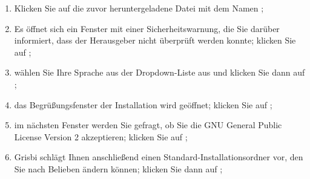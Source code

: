 \begin{enumerate}
	\item Klicken Sie auf die zuvor heruntergeladene Datei mit dem Namen ;
	\item Es öffnet sich ein Fenster mit einer Sicherheitswarnung, die Sie darüber informiert, dass der Herausgeber nicht überprüft werden konnte; klicken Sie auf ;
	\item wählen Sie Ihre Sprache aus der Dropdown-Liste aus und klicken Sie dann auf ;
	\item das Begrüßungsfenster der Installation wird geöffnet; klicken Sie auf ;
	\item im nächsten Fenster werden Sie gefragt, ob Sie die \gls{GNU General Public License} Version 2 akzeptieren; klicken Sie auf ;
	\item Grisbi schlägt Ihnen anschließend einen Standard-Installationsordner vor, den Sie nach Belieben ändern können; klicken Sie dann auf ;

\end{enumerate}
